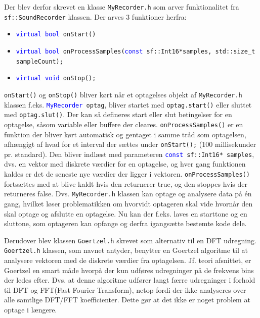 Der blev derfor skrevet en klasse \texttt{MyRecorder.h} som arver funktionalitet fra \texttt{sf::\textcolor{dkgreen}{SoundRecorder}} klassen. Der arves 3 funktioner herfra:
\begin{itemize}
	\item \texttt{\textcolor{blue}{virtual bool} onStart()}
	
	\item \texttt{\textcolor{blue}{virtual bool} onProcessSamples(\textcolor{blue}{const} sf::\textcolor{dkgreen}{Int16*}samples, std::\textcolor{dkgreen}{size\_t} sampleCount);}
	
	\item \texttt{\textcolor{blue}{virtual void} onStop();}
\end{itemize}
\texttt{onStart()} og \texttt{onStop()} bliver kørt når et optagelses objekt af \texttt{MyRecorder.h} klassen f.eks. \texttt{\textcolor{blue}{MyRecorder} optag}, bliver startet med \texttt{optag.start()} eller sluttet med \texttt{optag.slut()}. Der kan så defineres start eller slut betingelser for en optagelse, såsom variable eller buffere der cleares.
\newline
\texttt{onProcessSamples()} er en funktion der bliver kørt automatisk og gentaget i samme tråd som optagelsen, afhængigt af hvad for et interval der sættes under \texttt{onStart();} (100 millisekunder pr. standard). Den bliver indlæst med parameteren \texttt{\textcolor{blue}{const} sf::\textcolor{dkgreen}{Int16*} samples}, dvs. en vektor med diskrete værdier for en optagelse, og hver gang funktionen kaldes er det de seneste nye værdier der ligger i vektoren. \texttt{onProcessSamples()} fortsættes med at blive kaldt hvis den returnerer true, og den stoppes hvis der returneres false.
\newline
Dvs. \texttt{MyRecorder.h} klassen kan optage og analysere data på én gang, hvilket løser problematikken om hvorvidt optageren skal vide hvornår den skal optage og afslutte en optagelse. Nu kan der f.eks. laves en starttone og en sluttone, som optageren kan opfange og derfra igangsætte bestemte kode dele.
\newline

Derudover blev klassen \texttt{Goertzel.h} skrevet som alternativ til en DFT udregning.
\newline
\texttt{Goertzel.h} klassen, som navnet antyder, benytter en Goertzel algoritme til at analysere vektoren med de diskrete værdier fra optagelsen. Jf. teori afsnittet, er Goertzel en smart måde hvorpå der kun udføres udregninger på de frekvens bins der ledes efter.
\newline
Dvs. at denne algoritme udfører langt færre udregninger i forhold til DFT og FFT(Fast Fourier Transform), netop fordi der ikke analyseres over alle samtlige DFT/FFT koefficienter. Dette gør at det ikke er noget problem at optage i længere.  
\hfill \break

